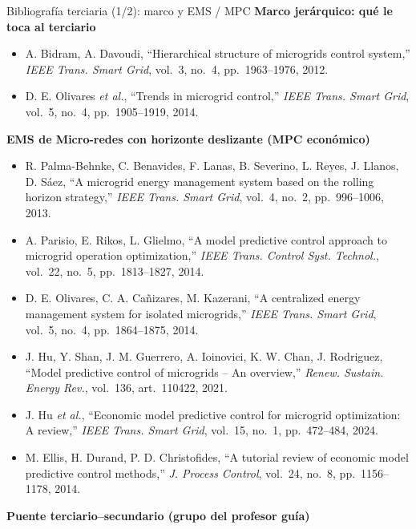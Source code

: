 \documentclass[aspectratio=169,10pt,t]{beamer}
\begin{document}
\begin{frame}{Bibliografía terciaria (1/2): marco y EMS / MPC}
  \fontsize{6}{7.1}\selectfont
  \textbf{\color{usachT}Marco jerárquico: qué le toca al terciario}
  \begin{itemize}\setlength\itemsep{0.5pt}
    \item[{[T1]}] A. Bidram, A. Davoudi, ``Hierarchical structure of microgrids control system,'' \emph{IEEE Trans. Smart Grid}, vol.~3, no.~4, pp.~1963--1976, 2012.
    \item[{[T2]}] D. E. Olivares \emph{et al.}, ``Trends in microgrid control,'' \emph{IEEE Trans. Smart Grid}, vol.~5, no.~4, pp.~1905--1919, 2014.
  \end{itemize}
  \textbf{\color{usachT}EMS de Micro-redes con horizonte deslizante (MPC económico)}
  \begin{itemize}\setlength\itemsep{0.5pt}
    \item[{[T3]}] R. Palma-Behnke, C. Benavides, F. Lanas, B. Severino, L. Reyes, J. Llanos, D. Sáez, ``A microgrid energy management system based on the rolling horizon strategy,'' \emph{IEEE Trans. Smart Grid}, vol.~4, no.~2, pp.~996--1006, 2013.
    \item[{[T4]}] A. Parisio, E. Rikos, L. Glielmo, ``A model predictive control approach to microgrid operation optimization,'' \emph{IEEE Trans. Control Syst. Technol.}, vol.~22, no.~5, pp.~1813--1827, 2014.
    \item[{[T5]}] D. E. Olivares, C. A. Cañizares, M. Kazerani, ``A centralized energy management system for isolated microgrids,'' \emph{IEEE Trans. Smart Grid}, vol.~5, no.~4, pp.~1864--1875, 2014.
    \item[{[T6]}] J. Hu, Y. Shan, J. M. Guerrero, A. Ioinovici, K. W. Chan, J. Rodriguez, ``Model predictive control of microgrids -- An overview,'' \emph{Renew. Sustain. Energy Rev.}, vol.~136, art.~110422, 2021.
    \item[{[T7]}] J. Hu \emph{et al.}, ``Economic model predictive control for microgrid optimization: A review,'' \emph{IEEE Trans. Smart Grid}, vol.~15, no.~1, pp.~472--484, 2024.
    \item[{[T8]}] M. Ellis, H. Durand, P. D. Christofides, ``A tutorial review of economic model predictive control methods,'' \emph{J. Process Control}, vol.~24, no.~8, pp.~1156--1178, 2014.
  \end{itemize}
  \textbf{\color{usachT}Puente terciario--secundario (grupo del profesor guía)}
  \begin{itemize}\setlength\itemsep{0.5pt}

\end{itemize}
\end{frame}
\end{document}
